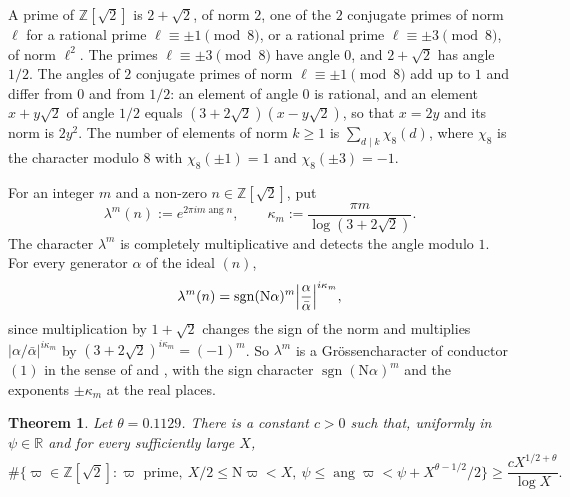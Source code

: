 \documentclass{article}
\numberwithin{equation}{section}
\newtheorem{theorem}{Theorem}
\newcommand{\Le}{\leqslant}
\newcommand{\Ge}{\geqslant}
\begin{document}
A prime of $\mathbb{Z}[\sqrt{2}]$ is $2 + \sqrt{2}$, of norm $2$, one of the $2$ conjugate primes of norm $\ell$ for a rational prime $\ell \equiv \pm 1 \pmod 8$, or a rational prime $\ell \equiv \pm 3 \pmod 8$, of norm $\ell^2$. The primes $\ell \equiv \pm 3 \pmod 8$ have angle $0$, and $2 + \sqrt{2}$ has angle $1/2$. The angles of $2$ conjugate primes of norm $\ell \equiv \pm 1 \pmod 8$ add up to $1$ and differ from $0$ and from $1/2$: an element of angle $0$ is rational, and an element $x + y\sqrt{2}$ of angle $1/2$ equals $(3 + 2\sqrt{2})(x - y\sqrt{2})$, so that $x = 2y$ and its norm is $2y^2$. The number of elements of norm $k \Ge 1$ is $\sum_{d \mid k} \chi_8(d)$, where $\chi_8$ is the character modulo $8$ with $\chi_8(\pm 1) = 1$ and $\chi_8(\pm 3) = -1$.

For an integer $m$ and a non-zero $n \in \mathbb{Z}[\sqrt{2}]$, put
\begin{equation}
\label{eq: sqrt2 character}
\lambda^m(n) := e^{2\pi i m \operatorname{ang} n}, \qquad \kappa_m := \frac{\pi m}{\log(3 + 2\sqrt{2})}.
\end{equation}
The character $\lambda^m$ is completely multiplicative and detects the angle modulo $1$. For every generator $\alpha$ of the ideal $(n)$,
\begin{equation*}
\lambda^m(n) = \operatorname{sgn}(\mathrm{N}\alpha)^m \Bigl| \frac{\alpha}{\bar\alpha} \Bigr|^{i\kappa_m},
\end{equation*}
since multiplication by $1 + \sqrt{2}$ changes the sign of the norm and multiplies $|\alpha/\bar\alpha|^{i\kappa_m}$ by $(3 + 2\sqrt{2})^{i\kappa_m} = (-1)^m$. So $\lambda^m$ is a Gr\"ossencharacter of conductor $(1)$ in the sense of \citet{coleman1990zero} and \citet{soehne1997upper}, with the sign character $\operatorname{sgn}(\mathrm{N}\alpha)^m$ and the exponents $\pm\kappa_m$ at the real places.

\begin{theorem}
\label{thm: sqrt2 sector}
Let $\theta = 0.1129$. There is a constant $c > 0$ such that, uniformly in $\psi \in \mathbb{R}$ and for every sufficiently large $X$,
\begin{equation*}
\#\bigl\{ \varpi \in \mathbb{Z}[\sqrt{2}] : \varpi \text{ prime},\ X/2 \Le \mathrm{N}\varpi < X,\ \psi \Le \operatorname{ang} \varpi < \psi + X^{\theta - 1/2}/2 \bigr\} \Ge \frac{c X^{1/2 + \theta}}{\log X}.
\end{equation*}
\end{theorem}
\end{document}
